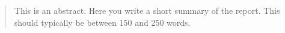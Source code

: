 \begin{abstract}\noindent
  This is an abstract. Here you write a short summary of the report. This should typically be between 150 and 250 words.
\end{abstract}

